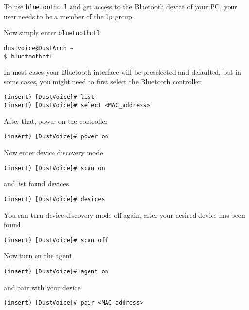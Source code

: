 \documentclass[10pt]{dustdoc}
\begin{document}
\begin{NOTE}
    To use \texttt{bluetoothctl} and get access to the Bluetooth device of your PC, your user needs to be a member of the \texttt{lp} group.
\end{NOTE}

Now simply enter \texttt{bluetoothctl}

\begin{verbatim}
dustvoice@DustArch ~
$ bluetoothctl
\end{verbatim}

In most cases your Bluetooth interface will be preselected and defaulted, but in some cases, you might need to first select the Bluetooth controller

\begin{verbatim}
(insert) [DustVoice]# list
(insert) [DustVoice]# select <MAC_address>
\end{verbatim}

After that, power on the controller

\begin{verbatim}
(insert) [DustVoice]# power on
\end{verbatim}

Now enter device discovery mode

\begin{verbatim}
(insert) [DustVoice]# scan on
\end{verbatim}

\noindent
and list found devices

\begin{verbatim}
(insert) [DustVoice]# devices
\end{verbatim}

\begin{NOTE}
    You can turn device discovery mode off again, after your desired device has been found

    \begin{verbatim}
(insert) [DustVoice]# scan off
    \end{verbatim}
\end{NOTE}

Now turn on the agent

\begin{verbatim}
(insert) [DustVoice]# agent on
\end{verbatim}

\noindent
and pair with your device

\begin{verbatim}
(insert) [DustVoice]# pair <MAC_address>
\end{verbatim}
\end{document}
